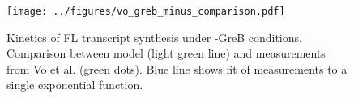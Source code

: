 
\begin{figure}
    \begin{center}
        \texttt{[image: ../figures/vo\_greb\_minus\_comparison.pdf]}
    \end{center}
    \caption{Kinetics of FL transcript synthesis under -GreB conditions.
      Comparison between model (light green line) and measurements from Vo
      et al. \cite{vo_vitro_2003-1} (green dots). Blue line shows fit of
      measurements to a single exponential function.}
\label{fig:vo_comparison}
\end{figure}
